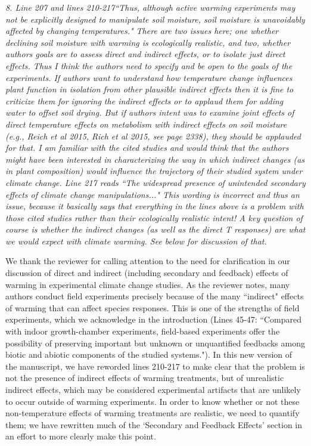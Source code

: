 \documentclass[11pt,a4paper]{letter}
\begin{document}
\par \emph{8. Line 207 and lines 210-217``Thus, although active warming experiments may not be explicitly designed to manipulate soil
moisture, soil moisture is unavoidably affected by changing temperatures." There are two issues here; one whether declining soil moisture with warming is ecologically
realistic, and two, whether authors goals are to assess direct and indirect effects, or to isolate
just direct effects. Thus I think the authors need to specify and be open to the goals of the
experiments. If authors want to understand how temperature change influences plant function
in isolation from other plausible indirect effects then it is fine to criticize them for ignoring the
indirect effects or to applaud them for adding water to offset soil drying. But if authors intent
was to examine joint effects of direct temperature effects on metabolism with indirect effects
on soil moisture (e.g., Reich et al 2015, Rich et al 2015, see page 2338), they should be
applauded for that. I am familiar with the cited studies and would think that the authors might
have been interested in characterizing the way in which indirect changes (as in plant
composition) would influence the trajectory of their studied system under climate change.
Line 217 reads ``The widespread presence of unintended secondary effects of climate change
manipulations..." This wording is incorrect and thus an issue, because it basically says that everything in the lines
above is a problem with those cited studies rather than their ecologically realistic intent! A key
question of course is whether the indirect changes (as well as the direct T responses) are what
we would expect with climate warming. See below for discussion of that.}
\\
\par We thank the reviewer for calling attention to the need for clarification in our discussion of direct and indirect (including secondary and feedback) effects of warming in experimental climate change studies. As the reviewer notes, many authors conduct field experiments precisely because of the many ``indirect" effects of warming that can affect species responses. This is one of the strengths of field experiments, which we acknowledge in the introduction (Lines 45-47: ``Compared with indoor growth-chamber experiments, field-based experiments offer the possibility of preserving important but unknown or unquantified feedbacks among biotic and abiotic components of the studied systems."). In this new version of the manuscript, we have reworded lines 210-217 to make clear that the problem is not the presence of indirect effects of warming treatments, but of unrealistic indirect effects, which may be considered experimental artifacts that are unlikely to occur outside of warming experiments. In order to know whether or not these non-temperature effects of warming treatments are realistic, we need to quantify them; we have rewritten much of the `Secondary and Feedback Effects' section in an effort to more clearly make this point.
\end{document}
